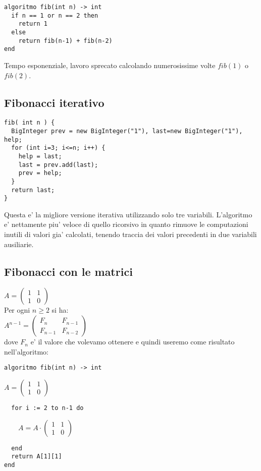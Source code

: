 \documentclass{article}
\begin{document}
\begin{lstlisting}
algoritmo fib(int n) -> int
  if n == 1 or n == 2 then
    return 1
  else
    return fib(n-1) + fib(n-2)
end
\end{lstlisting}

Tempo esponenziale, lavoro sprecato calcolando numerosissime volte $fib(1)$ o $fib(2)$.

\subsection{Fibonacci iterativo}

\begin{lstlisting}
fib( int n ) {
  BigInteger prev = new BigInteger("1"), last=new BigInteger("1"), help;
  for (int i=3; i<=n; i++) {
    help = last;
    last = prev.add(last);
    prev = help;
  }
  return last;
}
\end{lstlisting}

Questa e' la migliore versione iterativa utilizzando solo tre variabili. L'algoritmo e' nettamente piu' veloce di quello ricorsivo in quanto rimuove le computazioni inutili di valori gia' calcolati, tenendo traccia dei valori precedenti in due variabili ausiliarie.

\subsection{Fibonacci con le matrici}

$A = \begin{pmatrix}
1 & 1\\
1 & 0
\end{pmatrix}$ \\
Per ogni $n \geq 2$ si ha: \\
$A^{n-1} = \begin{pmatrix}
  F_n & F_{n-1}\\
  F_{n-1} & F_{n-2}
\end{pmatrix}$ \\
dove $F_n$ e' il valore che volevamo ottenere e quindi useremo come risultato nell'algoritmo: \\

\begin{lstlisting}
algoritmo fib(int n) -> int
\end{lstlisting}
$A = \begin{pmatrix}
1 & 1\\
1 & 0
\end{pmatrix}$
\begin{lstlisting}
  for i := 2 to n-1 do
\end{lstlisting}
$\quad \quad A = A \cdot \begin{pmatrix}
1 & 1\\
1 & 0
\end{pmatrix}$
\begin{lstlisting}
  end
  return A[1][1]
end
\end{lstlisting}
\end{document}

